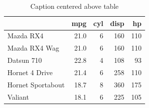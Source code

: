 \documentclass[
  authoryear,
  preprint]{elsarticle}
\begin{document}
{

\begin{longtable}[]{@{}lrrrr@{}}

\caption{\label{tbl-simple}Caption centered above table}

\tabularnewline

\toprule\noalign{}
& mpg & cyl & disp & hp \\
\midrule\noalign{}
\endhead
\bottomrule\noalign{}
\endlastfoot
Mazda RX4 & 21.0 & 6 & 160 & 110 \\
Mazda RX4 Wag & 21.0 & 6 & 160 & 110 \\
Datsun 710 & 22.8 & 4 & 108 & 93 \\
Hornet 4 Drive & 21.4 & 6 & 258 & 110 \\
Hornet Sportabout & 18.7 & 8 & 360 & 175 \\
Valiant & 18.1 & 6 & 225 & 105 \\

\end{longtable}

}


\renewcommand\refname{References}

\end{document}
